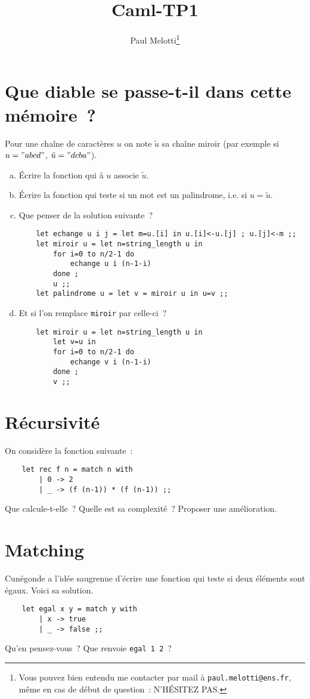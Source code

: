 \documentclass[10pt,a4paper]{article}
\begin{document}
\title{Caml-TP1}
\author{Paul Melotti\footnote{Vous pouvez bien entendu me contacter par mail à \texttt{paul.melotti@ens.fr}, même en cas de début de question~: N'HÉSITEZ PAS.}}
\maketitle{}

\section{Que diable se passe-t-il dans cette mémoire~?}
Pour une chaîne de caractères $u$ on note $\tilde{u}$ sa chaîne miroir (par exemple si $u = "abcd"$, $\tilde{u} = "dcba"$).
\begin{enumerate}[a)]
\item Écrire la fonction qui à $u$ associe $\tilde{u}$.

\item Écrire la fonction qui teste si un mot est un palindrome, i.e. si $u = \tilde{u}$.

\item Que penser de la solution suivante~?
\begin{verbatim}    let echange u i j = let m=u.[i] in u.[i]<-u.[j] ; u.[j]<-m ;;
    let miroir u = let n=string_length u in
        for i=0 to n/2-1 do
            echange u i (n-1-i)
        done ;
        u ;;
    let palindrome u = let v = miroir u in u=v ;;    
\end{verbatim}

\item Et si l'on remplace \texttt{miroir} par celle-ci~?
\begin{verbatim}    let miroir u = let n=string_length u in
        let v=u in
        for i=0 to n/2-1 do
            echange v i (n-1-i)
        done ;
        v ;;   
\end{verbatim}
\end{enumerate}

\section{Récursivité}
On considère la fonction suivante~:
\begin{verbatim}    let rec f n = match n with
        | 0 -> 2
        | _ -> (f (n-1)) * (f (n-1)) ;;\end{verbatim}
Que calcule-t-elle~? Quelle est sa complexité~? Proposer une amélioration.

\section{Matching}
Cunégonde a l'idée saugrenue d'écrire une fonction qui teste si deux éléments sont égaux. Voici sa solution.
\begin{verbatim}    let egal x y = match y with
        | x -> true
        | _ -> false ;;\end{verbatim}
Qu'en pensez-vous~? Que renvoie \texttt{egal 1 2}~?
\end{document}
